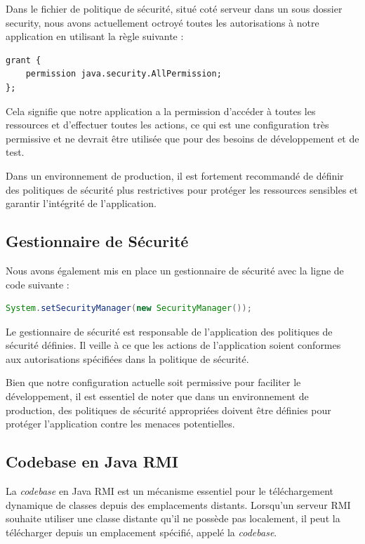 \documentclass{article} %
\begin{document}
Dans le fichier de politique de sécurité, situé coté serveur dans un sous dossier security,
nous avons actuellement octroyé toutes les autorisations
à notre application en utilisant la règle suivante :

\begin{lstlisting}
grant {
    permission java.security.AllPermission;
};
\end{lstlisting}

Cela signifie que notre application a la permission d'accéder à toutes les ressources
et d'effectuer toutes les actions, ce qui est une configuration très permissive et ne
devrait être utilisée que pour des besoins de développement et de test.

Dans un environnement de production, il est fortement recommandé de définir des politiques de sécurité
plus restrictives pour protéger les ressources sensibles et garantir l'intégrité de l'application.

\subsection{Gestionnaire de Sécurité}

Nous avons également mis en place un gestionnaire de sécurité avec la ligne de code suivante :

\begin{lstlisting}[language=Java]
System.setSecurityManager(new SecurityManager());
\end{lstlisting}

Le gestionnaire de sécurité est responsable de l'application des politiques de sécurité définies.
Il veille à ce que les actions de l'application soient conformes aux autorisations spécifiées
dans la politique de sécurité.

Bien que notre configuration actuelle soit permissive pour faciliter le développement,
il est essentiel de noter que dans un environnement de production, des politiques de sécurité
appropriées doivent être définies pour protéger l'application contre les menaces potentielles.

\subsection{Codebase en Java RMI}\label{sec:codebase}

La \textit{codebase} en Java RMI est un mécanisme essentiel pour le téléchargement 
dynamique de classes depuis des emplacements distants. 
Lorsqu'un serveur RMI souhaite utiliser une classe distante qu'il ne possède pas localement, 
il peut la télécharger depuis un emplacement spécifié, appelé la \textit{codebase}. 
\end{document}
